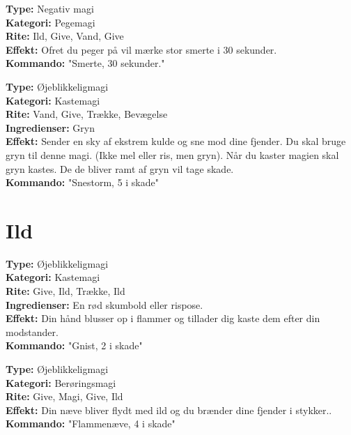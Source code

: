 \begin{vand*}[Skoldning]
\textbf{Type:} Negativ magi\\
\textbf{Kategori:} Pegemagi\\
\textbf{Rite:} Ild, Give, Vand, Give\\
\textbf{Effekt:} Ofret du peger på vil mærke stor smerte i 30 sekunder.\\
\textbf{Kommando:} "Smerte, 30 sekunder."
\end{vand*}

\begin{vand*}[Snestorm]
\textbf{Type:} Øjeblikkeligmagi\\
\textbf{Kategori:} Kastemagi\\
\textbf{Rite:} Vand, Give, Trække, Bevægelse\\
\textbf{Ingredienser:} Gryn\\
\textbf{Effekt:} Sender en sky af ekstrem kulde og sne mod dine fjender. Du skal bruge gryn til denne magi. (Ikke mel eller ris, men gryn). Når du kaster magien skal gryn kastes. De de bliver ramt af gryn vil tage skade.\\
\textbf{Kommando:} "Snestorm, 5 i skade"
\end{vand*}

\section{Ild}
\begin{ild*}[Gnist]
\textbf{Type:} Øjeblikkeligmagi\\
\textbf{Kategori:} Kastemagi\\
\textbf{Rite:} Give, Ild, Trække, Ild\\
\textbf{Ingredienser:} En rød skumbold eller rispose.\\
\textbf{Effekt:} Din hånd blusser op i flammer og tillader dig kaste dem efter din modstander.\\ 
\textbf{Kommando:} "Gnist, 2 i skade"
\end{ild*}

\begin{ild*}[Flammenæve]
\textbf{Type:} Øjeblikkeligmagi\\
\textbf{Kategori:} Berøringsmagi\\
\textbf{Rite:} Give, Magi, Give, Ild\\
\textbf{Effekt:} Din næve bliver flydt med ild og du brænder dine fjender i stykker..\\
\textbf{Kommando:} "Flammenæve, 4 i skade"
\end{ild*}

